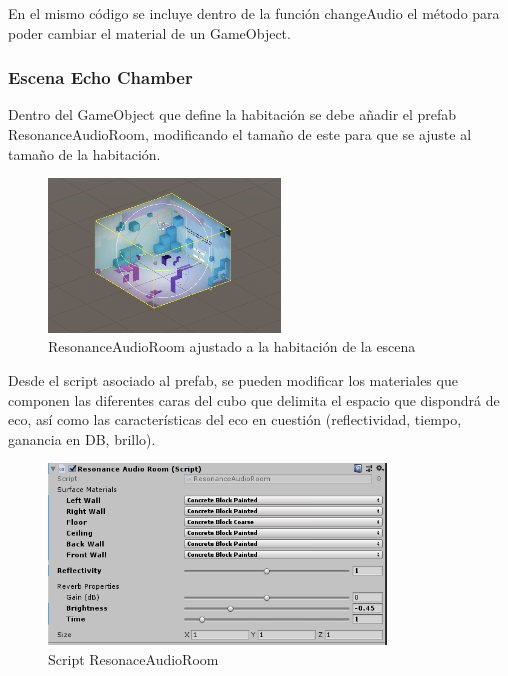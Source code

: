 \quad En el mismo código se incluye dentro de la función changeAudio el método para poder cambiar el material de un GameObject.\\

	\subsubsection{Escena Echo Chamber}
\quad Dentro del GameObject que define la habitación se debe añadir el prefab ResonanceAudioRoom, modificando el tamaño de este para que se ajuste al tamaño de la habitación.

\begin{figure}[htb]
	\centering
	\includegraphics[width=0.55\textwidth]{./imagenes/echoroom}
	\caption{ResonanceAudioRoom ajustado a la habitación de la escena}
\end{figure}
\FloatBarrier

\quad Desde el script asociado al prefab, se pueden modificar los materiales que componen las diferentes caras del cubo que delimita el espacio que dispondrá de eco, así como las características del eco en cuestión (reflectividad, tiempo, ganancia en DB, brillo).

\begin{figure}[htb]
	\centering
	\includegraphics[width=0.8\textwidth]{./imagenes/audioroom}
	\caption{Script ResonaceAudioRoom}
\end{figure}
\FloatBarrier

